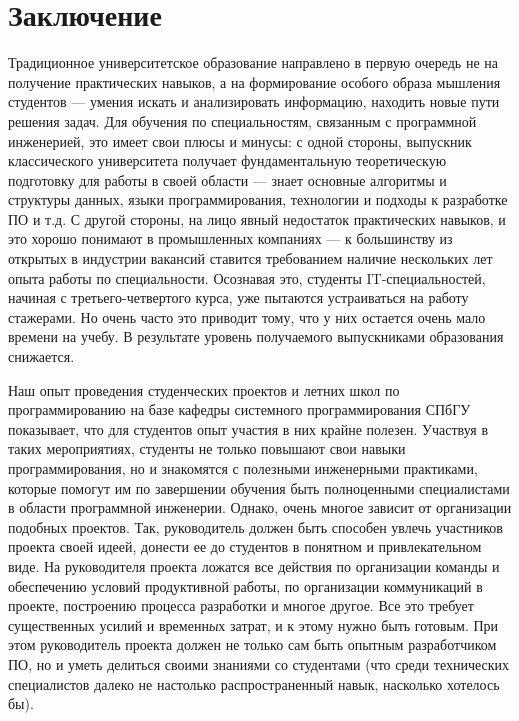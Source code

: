\documentclass[a4paper]{article}
\begin{document}
\section{Заключение} 

Традиционное университетское образование направлено в первую очередь не на получение практических навыков, а на формирование особого образа мышления студентов --- умения искать и анализировать информацию, находить новые пути решения задач. Для обучения по специальностям, связанным с программной инженерией, это имеет свои плюсы и минусы: с одной стороны, выпускник классического университета получает фундаментальную теоретическую подготовку для работы в своей области --- знает основные алгоритмы и структуры данных, языки программирования, технологии и подходы к разработке ПО и т.д. С другой стороны, на лицо явный недостаток практических навыков, и это хорошо понимают в промышленных компаниях --- к большинству из открытых в индустрии вакансий ставится требованием наличие нескольких лет опыта работы по специальности. Осознавая это, студенты IT-специальностей, начиная с третьего-четвертого курса, уже пытаются устраиваться на работу стажерами. Но очень часто это приводит тому, что у них остается очень мало времени на учебу. В результате уровень получаемого выпускниками образования снижается.

Наш опыт проведения студенческих проектов и летних школ по программированию на базе кафедры системного программирования СПбГУ показывает, что для студентов опыт участия в них крайне полезен. Участвуя в таких мероприятиях, студенты не только повышают свои навыки программирования, но и знакомятся с полезными инженерными практиками, которые помогут им по завершении обучения быть полноценными специалистами в области программной инженерии. Однако, очень многое зависит от организации подобных проектов. Так, руководитель должен быть способен увлечь участников проекта своей идеей, донести ее до студентов в понятном и привлекательном виде. На руководителя проекта ложатся все действия по организации команды и обеспечению условий продуктивной работы, по организации коммуникаций в проекте, построению процесса разработки и многое другое. Все это требует существенных усилий и временн\textit{ы}х затрат, и к этому нужно быть готовым. При этом руководитель проекта должен не только сам быть опытным разработчиком ПО, но и уметь делиться своими знаниями со студентами (что среди технических специалистов далеко не настолько распространенный навык, насколько хотелось бы). 
\end{document}
